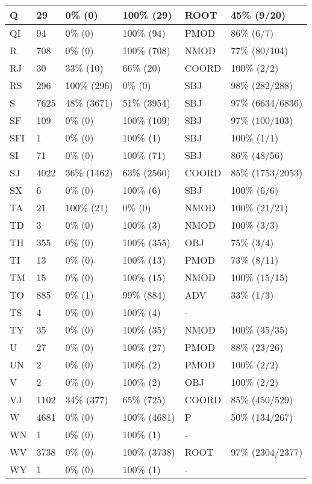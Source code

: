 \begin{figure*}
\begin{tabular}{|l|l|l|l||l|l|}
\hline
 Q & 29 & 0\% (0) & 100\% (29) & ROOT & 45\% (9/20) \\ 
\hline
 QI & 94 & 0\% (0) & 100\% (94) & PMOD & 86\% (6/7) \\ 
\hline
 R & 708 & 0\% (0) & 100\% (708) & NMOD & 77\% (80/104) \\ 
\hline
 RJ & 30 & 33\% (10) & 66\% (20) & COORD & 100\% (2/2) \\ 
\hline
 RS & 296 & 100\% (296) & 0\% (0) & SBJ & 98\% (282/288) \\ 
\hline
 S & 7625 & 48\% (3671) & 51\% (3954) & SBJ & 97\% (6634/6836) \\ 
\hline
 SF & 109 & 0\% (0) & 100\% (109) & SBJ & 97\% (100/103) \\ 
\hline
 SFI & 1 & 0\% (0) & 100\% (1) & SBJ & 100\% (1/1) \\ 
\hline
 SI & 71 & 0\% (0) & 100\% (71) & SBJ & 86\% (48/56) \\ 
\hline
 SJ & 4022 & 36\% (1462) & 63\% (2560) & COORD & 85\% (1753/2053) \\ 
\hline
 SX & 6 & 0\% (0) & 100\% (6) & SBJ & 100\% (6/6) \\ 
\hline
 TA & 21 & 100\% (21) & 0\% (0) & NMOD & 100\% (21/21) \\ 
\hline
 TD & 3 & 0\% (0) & 100\% (3) & NMOD & 100\% (3/3) \\ 
\hline
 TH & 355 & 0\% (0) & 100\% (355) & OBJ & 75\% (3/4) \\ 
\hline
 TI & 13 & 0\% (0) & 100\% (13) & PMOD & 73\% (8/11) \\ 
\hline
 TM & 15 & 0\% (0) & 100\% (15) & NMOD & 100\% (15/15) \\ 
\hline
 TO & 885 & 0\% (1) & 99\% (884) & ADV & 33\% (1/3) \\ 
\hline
 TS & 4 & 0\% (0) & 100\% (4) & - &  \\ 
\hline
 TY & 35 & 0\% (0) & 100\% (35) & NMOD & 100\% (35/35) \\ 
\hline
 U & 27 & 0\% (0) & 100\% (27) & PMOD & 88\% (23/26) \\ 
\hline
 UN & 2 & 0\% (0) & 100\% (2) & PMOD & 100\% (2/2) \\ 
\hline
 V & 2 & 0\% (0) & 100\% (2) & OBJ & 100\% (2/2) \\ 
\hline
 VJ & 1102 & 34\% (377) & 65\% (725) & COORD & 85\% (450/529) \\ 
\hline
 W & 4681 & 0\% (0) & 100\% (4681) & P & 50\% (134/267) \\ 
\hline
 WN & 1 & 0\% (0) & 100\% (1) & - &  \\ 
\hline
 WV & 3738 & 0\% (0) & 100\% (3738) & ROOT & 97\% (2304/2377) \\ 
\hline
 WY & 1 & 0\% (0) & 100\% (1) & - &  \\ 
\hline
\end{tabular}
\end{figure*}

